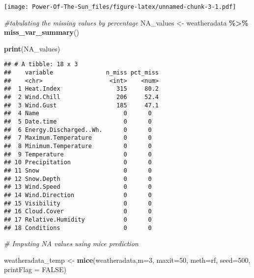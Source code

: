 \documentclass[
]{article}
\newenvironment{Shaded}{\begin{snugshade}}{\end{snugshade}}
\newcommand{\AttributeTok}[1]{\textcolor[rgb]{0.13,0.29,0.53}{#1}}
\newcommand{\CommentTok}[1]{\textcolor[rgb]{0.56,0.35,0.01}{\textit{#1}}}
\newcommand{\ConstantTok}[1]{\textcolor[rgb]{0.56,0.35,0.01}{#1}}
\newcommand{\DecValTok}[1]{\textcolor[rgb]{0.00,0.00,0.81}{#1}}
\newcommand{\FunctionTok}[1]{\textcolor[rgb]{0.13,0.29,0.53}{\textbf{#1}}}
\newcommand{\NormalTok}[1]{#1}
\newcommand{\OtherTok}[1]{\textcolor[rgb]{0.56,0.35,0.01}{#1}}
\newcommand{\SpecialCharTok}[1]{\textcolor[rgb]{0.81,0.36,0.00}{\textbf{#1}}}
\newcommand{\StringTok}[1]{\textcolor[rgb]{0.31,0.60,0.02}{#1}}
\begin{document}
\texttt{[image: Power-Of-The-Sun\_files/figure-latex/unnamed-chunk-3-1.pdf]}

\begin{Shaded}
\begin{Highlighting}[]
\CommentTok{\#tabulating the missing values by percentage}
\NormalTok{NA\_values }\OtherTok{\textless{}{-}}\NormalTok{ weatheradata }\SpecialCharTok{\%\textgreater{}\%}
  \FunctionTok{miss\_var\_summary}\NormalTok{()}

\FunctionTok{print}\NormalTok{(NA\_values) }
\end{Highlighting}
\end{Shaded}

\begin{verbatim}
## # A tibble: 18 x 3
##    variable               n_miss pct_miss
##    <chr>                   <int>    <num>
##  1 Heat.Index                315     80.2
##  2 Wind.Chill                206     52.4
##  3 Wind.Gust                 185     47.1
##  4 Name                        0      0  
##  5 Date.time                   0      0  
##  6 Energy.Discharged..Wh.      0      0  
##  7 Maximum.Temperature         0      0  
##  8 Minimum.Temperature         0      0  
##  9 Temperature                 0      0  
## 10 Precipitation               0      0  
## 11 Snow                        0      0  
## 12 Snow.Depth                  0      0  
## 13 Wind.Speed                  0      0  
## 14 Wind.Direction              0      0  
## 15 Visibility                  0      0  
## 16 Cloud.Cover                 0      0  
## 17 Relative.Humidity           0      0  
## 18 Conditions                  0      0
\end{verbatim}

\begin{Shaded}
\begin{Highlighting}[]
\CommentTok{\# Imputing NA values using mice prediction }

\NormalTok{weatheradata\_temp }\OtherTok{\textless{}{-}} \FunctionTok{mice}\NormalTok{(weatheradata,}\AttributeTok{m=}\DecValTok{3}\NormalTok{, }
                          \AttributeTok{maxit=}\DecValTok{50}\NormalTok{, }
                          \AttributeTok{meth=}\StringTok{\textquotesingle{}rf\textquotesingle{}}\NormalTok{, }
                          \AttributeTok{seed=}\DecValTok{500}\NormalTok{, }
                          \AttributeTok{printFlag =} \ConstantTok{FALSE}\NormalTok{)}
\end{Highlighting}
\end{Shaded}
\end{document}
